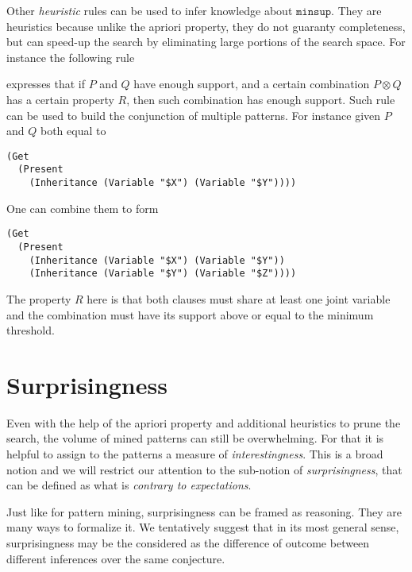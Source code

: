 \documentclass[runningheads]{llncs}
\begin{document}
Other \emph{heuristic} rules can be used to infer knowledge about
$\texttt{minsup}$. They are heuristics because unlike the apriori
property, they do not guaranty completeness, but can speed-up the
search by eliminating large portions of the search space. For instance
the following rule
\begin{prooftree}
\end{prooftree}
expresses that if $P$ and $Q$ have enough support, and a certain
combination $P\otimes Q$ has a certain property $R$, then such
combination has enough support. Such rule can be used to build the
conjunction of multiple patterns. For instance given $P$ and $Q$ both
equal to
\begin{verbatim}
(Get
  (Present
    (Inheritance (Variable "$X") (Variable "$Y"))))
\end{verbatim}
One can combine them to form
\begin{verbatim}
(Get
  (Present
    (Inheritance (Variable "$X") (Variable "$Y"))
    (Inheritance (Variable "$Y") (Variable "$Z"))))
\end{verbatim}
The property $R$ here is that both clauses must share at least one
joint variable and the combination must have its support above or
equal to the minimum threshold.

\section{Surprisingness}
\label{SUR}

Even with the help of the apriori property and additional heuristics
to prune the search, the volume of mined patterns can still be
overwhelming. For that it is helpful to assign to the patterns a
measure of \emph{interestingness}. This is a broad notion and we will
restrict our attention to the sub-notion of \emph{surprisingness},
that can be defined as what is \emph{contrary to expectations}.

Just like for pattern mining, surprisingness can be framed as
reasoning. They are many ways to formalize it.  We tentatively suggest that in its
most general sense, surprisingness may be the considered as the difference of outcome
between different inferences over the same conjecture. 
\end{document}
